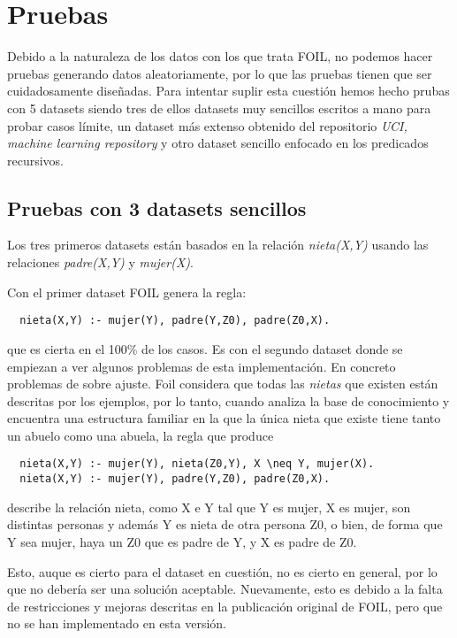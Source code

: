 \section{Pruebas}
Debido a la naturaleza de los datos con los que trata FOIL, no podemos hacer pruebas generando datos aleatoriamente, por lo que las pruebas tienen que ser cuidadosamente diseñadas. Para intentar suplir esta cuestión hemos hecho prubas con 5 datasets siendo tres de ellos datasets muy sencillos escritos a mano para probar casos límite, un dataset más extenso obtenido del repositorio \emph{UCI, machine learning repository} y otro dataset sencillo enfocado en los predicados recursivos.

\clearpage

\subsection{Pruebas con 3 datasets sencillos}
Los tres primeros datasets están basados en la relación \emph{nieta(X,Y)} usando las relaciones \emph{padre(X,Y)} y \emph{mujer(X)}.

Con el primer dataset FOIL genera la regla:
\begin{lstlisting}
  nieta(X,Y) :- mujer(Y), padre(Y,Z0), padre(Z0,X).
\end{lstlisting}
que es cierta en el 100\% de los casos.
Es con el segundo dataset donde se empiezan a ver algunos problemas de esta implementación. En concreto problemas de sobre ajuste. Foil considera que todas las \emph{nietas} que existen están descritas por los ejemplos, por lo tanto, cuando analiza la base de conocimiento y encuentra una estructura familiar en la que la única nieta que existe tiene tanto un abuelo como una abuela, la regla que produce
\begin{lstlisting}
  nieta(X,Y) :- mujer(Y), nieta(Z0,Y), X \neq Y, mujer(X).
  nieta(X,Y) :- mujer(Y), padre(Y,Z0), padre(Z0,X).
\end{lstlisting}
describe la relación nieta, como X e Y tal que Y es mujer, X es mujer, son distintas personas y además Y es nieta de otra persona Z0, o bien, de forma que Y sea mujer, haya un Z0 que es padre de Y, y X es padre de Z0.

Esto, auque es cierto para el dataset en cuestión, no es cierto en general, por lo que no debería ser una solución aceptable. Nuevamente, esto es debido a la falta de restricciones y mejoras descritas en la publicación original de FOIL, pero que no se han implementado en esta versión.

